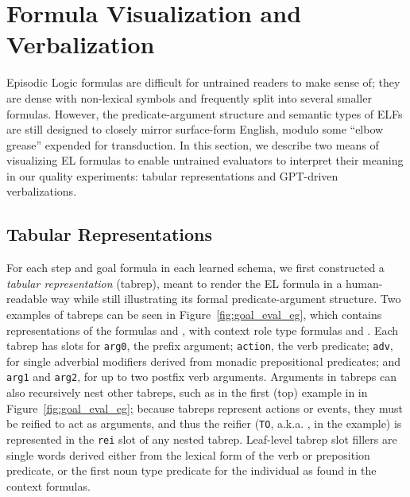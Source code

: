 \section{Formula Visualization and Verbalization}
\label{sec:verbviz}
Episodic Logic formulas are difficult for untrained readers to make sense of; they are dense with non-lexical symbols and frequently split into several smaller formulas. However, the predicate-argument structure and semantic types of ELFs are still designed to closely mirror surface-form English, modulo some ``elbow grease'' expended for transduction. In this section, we describe two means of visualizing EL formulas to enable untrained evaluators to interpret their meaning in our quality experiments: tabular representations and GPT-driven verbalizations.

\subsection{Tabular Representations}

For each step and goal formula in each learned schema, we first constructed a \textit{tabular representation} (tabrep), meant to render the EL formula in a human-readable way while still illustrating its formal predicate-argument structure. Two examples of tabreps can be seen in Figure~\ref{fig:goal_eval_eg}, which contains representations of the formulas  and , with context role type formulas  and . Each tabrep has slots for \texttt{arg0}, the prefix argument; \texttt{action}, the verb predicate; \texttt{adv}, for single adverbial modifiers derived from monadic prepositional predicates; and \texttt{arg1} and \texttt{arg2}, for up to two postfix verb arguments. Arguments in tabreps can also recursively nest other tabreps, such as in the first (top) example in in Figure~\ref{fig:goal_eval_eg}; because tabreps represent actions or events, they must be reified to act as arguments, and thus the reifier (\texttt{TO}, a.k.a. , in the example) is represented in the \texttt{rei} slot of any nested tabrep. Leaf-level tabrep slot fillers are single words derived either from the lexical form of the verb or preposition predicate, or the first noun type predicate for the individual as found in the context formulas.

